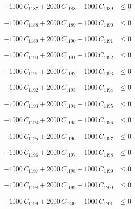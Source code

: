 \documentclass[a4paper,11pt]{article}
\begin{document}
\begin{align}
-1000\,C_{1187} + 2000\,C_{1188} - 1000\,C_{1189} &\leq 0 \nonumber
\end{align}

\begin{align}
-1000\,C_{1188} + 2000\,C_{1189} - 1000\,C_{1190} &\leq 0 \nonumber
\end{align}

\begin{align}
-1000\,C_{1189} + 2000\,C_{1190} - 1000\,C_{1191} &\leq 0 \nonumber
\end{align}

\begin{align}
-1000\,C_{1190} + 2000\,C_{1191} - 1000\,C_{1192} &\leq 0 \nonumber
\end{align}

\begin{align}
-1000\,C_{1191} + 2000\,C_{1192} - 1000\,C_{1193} &\leq 0 \nonumber
\end{align}

\begin{align}
-1000\,C_{1192} + 2000\,C_{1193} - 1000\,C_{1194} &\leq 0 \nonumber
\end{align}

\begin{align}
-1000\,C_{1193} + 2000\,C_{1194} - 1000\,C_{1195} &\leq 0 \nonumber
\end{align}

\begin{align}
-1000\,C_{1194} + 2000\,C_{1195} - 1000\,C_{1196} &\leq 0 \nonumber
\end{align}

\begin{align}
-1000\,C_{1195} + 2000\,C_{1196} - 1000\,C_{1197} &\leq 0 \nonumber
\end{align}

\begin{align}
-1000\,C_{1196} + 2000\,C_{1197} - 1000\,C_{1198} &\leq 0 \nonumber
\end{align}

\begin{align}
-1000\,C_{1197} + 2000\,C_{1198} - 1000\,C_{1199} &\leq 0 \nonumber
\end{align}

\begin{align}
-1000\,C_{1198} + 2000\,C_{1199} - 1000\,C_{1200} &\leq 0 \nonumber
\end{align}

\begin{align}
-1000\,C_{1199} + 2000\,C_{1200} - 1000\,C_{1201} &\leq 0 \nonumber
\end{align}
\end{document}
